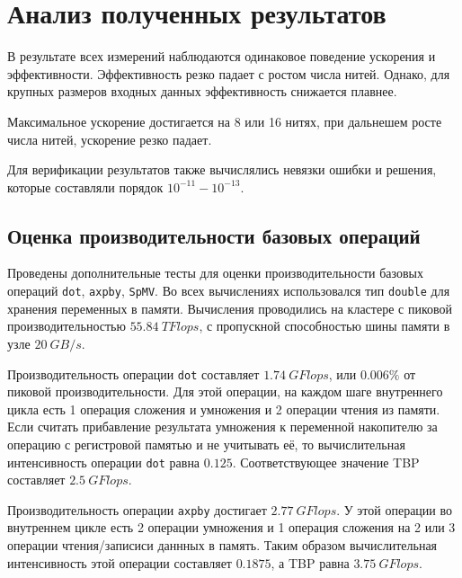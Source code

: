 \documentclass[12pt, oneside, a4paper]{article}
\begin{document}

\section{Анализ полученных результатов}

В результате всех измерений наблюдаются одинаковое поведение ускорения и эффективности. Эффективность резко падает с ростом числа нитей. Однако, для крупных размеров входных данных эффективность снижается плавнее.

Максимальное ускорение достигается на 8 или 16 нитях, при дальнешем росте числа нитей, ускорение резко падает.

Для верификации результатов также вычислялись невязки ошибки и решения, которые составляли порядок $10^{-11} - 10^{-13}$.

\subsection{Оценка производительности базовых операций}

Проведены дополнительные тесты для оценки производительности базовых операций \texttt{dot}, \texttt{axpby}, \texttt{SpMV}. Во всех вычислениях использовался тип \texttt{double} для хранения переменных в памяти. Вычисления проводились на кластере с пиковой производительностью $55.84\ TFlops$, с пропускной способностью шины памяти в узле $20\ GB/s$.

Производительность операции \texttt{dot} составляет $1.74\ GFlops$, или $0.006\%$ от пиковой производительности. Для этой операции, на каждом шаге внутреннего цикла есть 1 операция сложения и умножения и 2 операции чтения из памяти. Если считать прибавление результата умножения к переменной накопителю за операцию с регистровой памятью и не учитывать её, то вычислительная интенсивность операции \texttt{dot} равна $0.125$. Соответствующее значение TBP составляет $2.5\ GFlops$.

Производительность операции \texttt{axpby} достигает $2.77\ GFlops$. У этой операции во внутреннем цикле есть 2 операции умножения и 1 операция сложения на 2 или 3 операции чтения/записиси даннных в память. Таким образом вычислительная интенсивность этой операции составляет $0.1875$, а TBP равна $3.75\ GFlops$.
\end{document}
